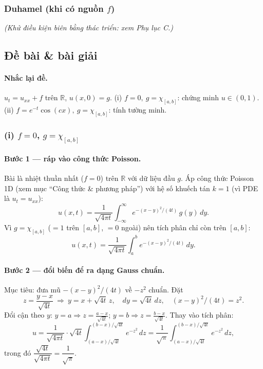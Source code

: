 \subsubsection*{Duhamel (khi có nguồn $f$)}

\emph{(Khử điều kiện biên bằng thác triển: xem Phụ lục C.)}

\subsection*{Đề bài \& bài giải}
\paragraph{Nhắc lại đề.} $u_t=u_{xx}+f$ trên $\mathbb{R}$, $u(x,0)=g$. (i) $f=0,\ g=\chi_{[a,b]}$: chứng minh
$u\in(0,1)$. (ii) $f=e^{-t}\cos(cx),\ g=\chi_{[a,b]}$: tính tường minh.

\subsubsection*{(i) $f=0$, $g=\chi_{[a,b]}$}

\paragraph{Bước 1 --- ráp vào công thức Poisson.} Bài là nhiệt thuần nhất ($f=0$) trên $\mathbb{R}$ với dữ liệu đầu $g$. Áp công thức Poisson 1D (xem mục ``Công thức \& phương pháp'') với hệ số khuếch tán $k=1$ (vì PDE là $u_t=u_{xx}$):
\[
  u(x,t)=\frac{1}{\sqrt{4\pi t}}\int_{-\infty}^{\infty} e^{-(x-y)^2/(4t)}\,g(y)\,dy.
\]
Vì $g=\chi_{[a,b]}$ ($=1$ trên $[a,b]$, $=0$ ngoài) nên tích phân chỉ còn trên $[a,b]$:
\[
  u(x,t)=\frac{1}{\sqrt{4\pi t}}\int_a^b e^{-(x-y)^2/(4t)}\,dy.
\]

\paragraph{Bước 2 --- đổi biến để ra dạng Gauss chuẩn.} Mục tiêu: đưa mũ $-(x-y)^2/(4t)$ về $-z^2$ chuẩn. Đặt
\[
  z=\frac{y-x}{\sqrt{4t}}\ \Longrightarrow\ y=x+\sqrt{4t}\,z,\quad dy=\sqrt{4t}\,dz,\quad (x-y)^2/(4t)=z^2.
\]
Đổi cận theo $y$: $y=a\Rightarrow z=\tfrac{a-x}{\sqrt{4t}}$; $y=b\Rightarrow z=\tfrac{b-x}{\sqrt{4t}}$. Thay vào tích phân:
\[
  u=\frac{1}{\sqrt{4\pi t}}\cdot\sqrt{4t}\int_{(a-x)/\sqrt{4t}}^{(b-x)/\sqrt{4t}} e^{-z^2}\,dz
  =\frac{1}{\sqrt\pi}\int_{(a-x)/\sqrt{4t}}^{(b-x)/\sqrt{4t}} e^{-z^2}\,dz,
\]
trong đó $\dfrac{\sqrt{4t}}{\sqrt{4\pi t}}=\dfrac{1}{\sqrt\pi}$.

